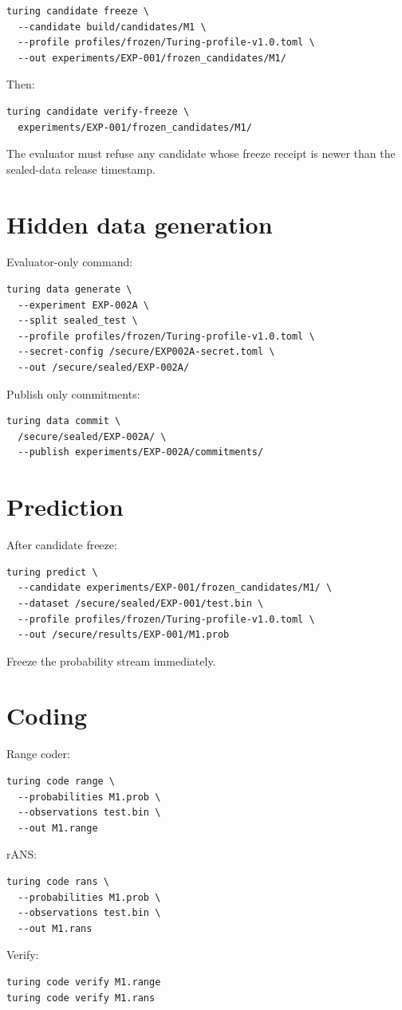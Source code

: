 \documentclass[11pt]{article}
\begin{document}
\begin{verbatim}
turing candidate freeze \
  --candidate build/candidates/M1 \
  --profile profiles/frozen/Turing-profile-v1.0.toml \
  --out experiments/EXP-001/frozen_candidates/M1/
\end{verbatim}
Then:
\begin{verbatim}
turing candidate verify-freeze \
  experiments/EXP-001/frozen_candidates/M1/
\end{verbatim}
The evaluator must refuse any candidate whose freeze receipt is newer than the sealed-data release timestamp.

\section{Hidden data generation}

Evaluator-only command:
\begin{verbatim}
turing data generate \
  --experiment EXP-002A \
  --split sealed_test \
  --profile profiles/frozen/Turing-profile-v1.0.toml \
  --secret-config /secure/EXP002A-secret.toml \
  --out /secure/sealed/EXP-002A/
\end{verbatim}
Publish only commitments:
\begin{verbatim}
turing data commit \
  /secure/sealed/EXP-002A/ \
  --publish experiments/EXP-002A/commitments/
\end{verbatim}

\section{Prediction}

After candidate freeze:
\begin{verbatim}
turing predict \
  --candidate experiments/EXP-001/frozen_candidates/M1/ \
  --dataset /secure/sealed/EXP-001/test.bin \
  --profile profiles/frozen/Turing-profile-v1.0.toml \
  --out /secure/results/EXP-001/M1.prob
\end{verbatim}
Freeze the probability stream immediately.

\section{Coding}

Range coder:
\begin{verbatim}
turing code range \
  --probabilities M1.prob \
  --observations test.bin \
  --out M1.range
\end{verbatim}
rANS:
\begin{verbatim}
turing code rans \
  --probabilities M1.prob \
  --observations test.bin \
  --out M1.rans
\end{verbatim}
Verify:
\begin{verbatim}
turing code verify M1.range
turing code verify M1.rans
\end{verbatim}
\end{document}
